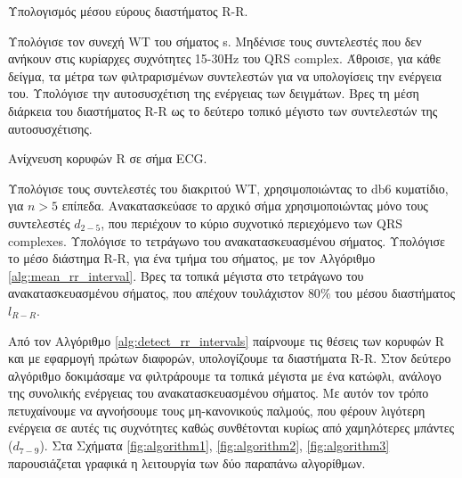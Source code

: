 \documentclass[11pt,a4paper]{article}
\renewcommand{\figurename}{Σχήμα}
\begin{document}
\begin{algorithm}  
  \caption{Υπολογισμός μέσου εύρους διαστήματος R-R.}
  \label{alg:mean_rr_interval}  
  \begin{algorithmic}[1]  
  	
  	\State Υπολόγισε τον συνεχή WT του σήματος s.
  	\State Μηδένισε τους συντελεστές που δεν ανήκουν στις κυρίαρχες συχνότητες 15-30Hz του QRS complex.
  	\State Άθροισε, για κάθε δείγμα, τα μέτρα των φιλτραρισμένων συντελεστών για να υπολογίσεις την ενέργεια του.
  	\State Υπολόγισε την αυτοσυσχέτιση της ενέργειας των δειγμάτων.
  	\State Βρες τη μέση διάρκεια του διαστήματος R-R ως το δεύτερο τοπικό μέγιστο των συντελεστών της αυτοσυσχέτισης.
  	
  \end{algorithmic}  
\end{algorithm}

\begin{algorithm}  
  \caption{Ανίχνευση κορυφών R σε σήμα ECG.}
  \label{alg:detect_rr_intervals}  
  \begin{algorithmic}[1]  
  	
  	\State Υπολόγισε τους συντελεστές του διακριτού WT, χρησιμοποιώντας το db6 κυματίδιο, για $n>5$ επίπεδα.
  	\State Ανακατασκεύασε το αρχικό σήμα χρησιμοποιώντας μόνο τους συντελεστές $d_{2-5}$, που περιέχουν το κύριο συχνοτικό περιεχόμενο των QRS complexes.
  	\State Υπολόγισε το τετράγωνο του ανακατασκευασμένου σήματος.
  	\State Υπολόγισε το μέσο διάστημα R-R, για ένα τμήμα του σήματος, με τον Αλγόριθμο \ref{alg:mean_rr_interval}.
  	\State Βρες τα τοπικά μέγιστα στο τετράγωνο του ανακατασκευασμένου σήματος, που απέχουν τουλάχιστον $80\%$ του μέσου διαστήματος $l_{R-R}$.
  	
  \end{algorithmic}  
\end{algorithm}

Από τον Αλγόριθμο \ref{alg:detect_rr_intervals} παίρνουμε τις θέσεις των κορυφών R και με εφαρμογή πρώτων διαφορών, υπολογίζουμε τα διαστήματα R-R. Στον δεύτερο αλγόριθμο δοκιμάσαμε να φιλτράρουμε τα τοπικά μέγιστα με ένα κατώφλι, ανάλογο της συνολικής ενέργειας του ανακατασκευασμένου σήματος. Με αυτόν τον τρόπο πετυχαίνουμε να αγνοήσουμε τους μη-κανονικούς παλμούς, που φέρουν λιγότερη ενέργεια σε αυτές τις συχνότητες καθώς συνθέτονται κυρίως από χαμηλότερες μπάντες ($d_{7-9}$).
Στα \figurename{τα \ref{fig:algorithm1}, \ref{fig:algorithm2}, \ref{fig:algorithm3}} παρουσιάζεται γραφικά η λειτουργία των δύο παραπάνω αλγορίθμων.
\end{document}
